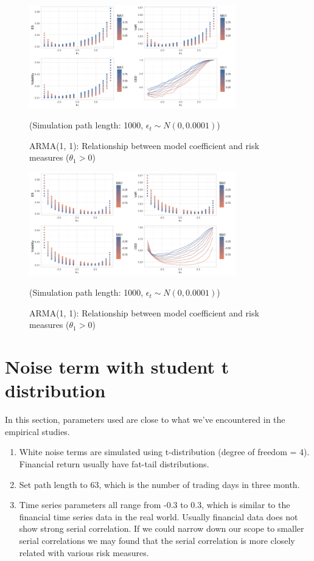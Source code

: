 \documentclass[11pt]{article}
\begin{document}
\begin{figure}[H]
\centering
\includegraphics[width = 0.8\textwidth]{../figures/simulation/AR1MA1_risk_measures_pos_coef}
\caption{ARMA(1, 1): Relationship between model coefficient and risk measures ($\theta_1>0$)}
(Simulation path length: 1000, $\epsilon_t \sim N(0, 0.0001)$)
\label{fig:AR1MA1_risk_measures_pos_coef}
\end{figure}

\begin{figure}[H]
\centering
\includegraphics[width = 0.8\textwidth]{../figures/simulation/AR1MA1_risk_measures_neg_coef}
\caption{ARMA(1, 1): Relationship between model coefficient and risk measures ($\theta_1>0$)}
(Simulation path length: 1000, $\epsilon_t \sim N(0, 0.0001)$)
\label{fig:AR1MA1_risk_measures_neg_coef}
\end{figure}



\section{Noise term with student t distribution}

In this section, parameters used are close to what we've encountered in the empirical studies. 
\begin{enumerate}
\item White noise terms are simulated using t-distribution (degree of freedom = 4). Financial return usually have fat-tail distributions.
\item Set path length to 63, which is the number of trading days in three month.
\item Time series parameters all range from -0.3 to 0.3, which is similar to the financial time series data in the real world. Usually financial data does not show strong serial correlation. If we could narrow down our scope to smaller serial correlations we may found that the serial correlation is more closely related with various risk measures.
\end{enumerate}
\end{document}
